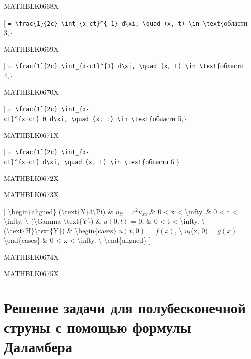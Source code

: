 \documentclass[
]{article}
\begin{document}
{{MATHBLK0668X

{[}
\texttt{=\ \textbackslash{}frac\{1\}\{2c\}\ \textbackslash{}int\_\{x-ct\}\^{}\{-1\}\ d\textbackslash{}xi,\ \textbackslash{}quad\ (x,\ t)\ \textbackslash{}in\ \textbackslash{}text\{}области
3,\} {]}

MATHBLK0669X

{[}
\texttt{=\ \textbackslash{}frac\{1\}\{2c\}\ \textbackslash{}int\_\{x-ct\}\^{}\{1\}\ d\textbackslash{}xi,\ \textbackslash{}quad\ (x,\ t)\ \textbackslash{}in\ \textbackslash{}text\{}области
4,\} {]}

MATHBLK0670X

{[}
\texttt{=\ \textbackslash{}frac\{1\}\{2c\}\ \textbackslash{}int\_\{x-ct\}\^{}\{x+ct\}\ 0\ d\textbackslash{}xi,\ \textbackslash{}quad\ (x,\ t)\ \textbackslash{}in\ \textbackslash{}text\{}области
5,\} {]}

MATHBLK0671X

{[}
\texttt{=\ \textbackslash{}frac\{1\}\{2c\}\ \textbackslash{}int\_\{x-ct\}\^{}\{x+ct\}\ d\textbackslash{}xi,\ \textbackslash{}quad\ (x,\ t)\ \textbackslash{}in\ \textbackslash{}text\{}области
6.\} {]}

MATHBLK0672X

MATHBLK0673X

{[} \textbackslash begin\{aligned\}
(\textbackslash text\{Y\}4\textbackslash Pi) \&
\(u_{tt} = c^2 u_{xx}\),\& 0 \textless{} x \textless{}
\textbackslash infty, \& 0 \textless{} t \textless{}
\textbackslash infty, \textbackslash{} (\textbackslash Gamma
\textbackslash text\{Y\}) \& \(u(0, t)\) = 0, \& 0 \textless{} t
\textless{} \textbackslash infty, \textbackslash{}
(\textbackslash text\{H\}\textbackslash text\{Y\}) \&
\textbackslash begin\{cases\} \(u(x, 0)\) = \(f(x)\), \textbackslash{}
\(u_t\)(x, 0) = \(g(x)\). \textbackslash end\{cases\} \& 0 \textless{} x
\textless{} \textbackslash infty, \textbackslash{}
\textbackslash end\{aligned\} {]}

MATHBLK0674X

MATHBLK0675X

\section{Решение задачи для полубесконечной струны с помощью формулы
Даламбера}\label{ux440ux435ux448ux435ux43dux438ux435-ux437ux430ux434ux430ux447ux438-ux434ux43bux44f-ux43fux43eux43bux443ux431ux435ux441ux43aux43eux43dux435ux447ux43dux43eux439-ux441ux442ux440ux443ux43dux44b-ux441-ux43fux43eux43cux43eux449ux44cux44e-ux444ux43eux440ux43cux443ux43bux44b-ux434ux430ux43bux430ux43cux431ux435ux440ux430}

}}
\end{document}
